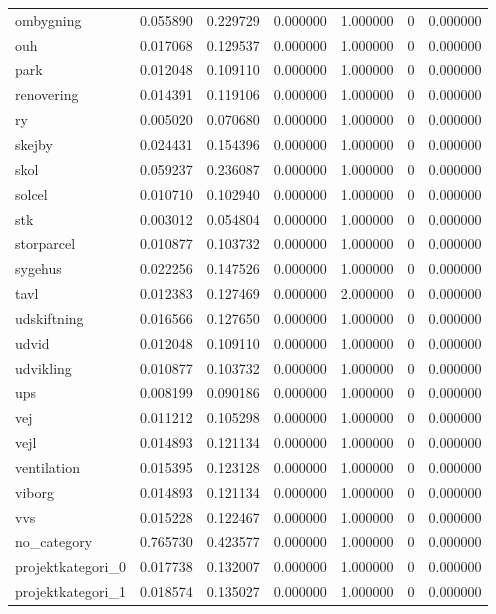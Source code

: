 \begin{landscape}
\begin{longtable}[h!]{lrrllrr}
ombygning & 0.055890 & 0.229729 & 0.000000 & 1.000000 & 0 & 0.000000 \\
ouh & 0.017068 & 0.129537 & 0.000000 & 1.000000 & 0 & 0.000000 \\
park & 0.012048 & 0.109110 & 0.000000 & 1.000000 & 0 & 0.000000 \\
renovering & 0.014391 & 0.119106 & 0.000000 & 1.000000 & 0 & 0.000000 \\
ry & 0.005020 & 0.070680 & 0.000000 & 1.000000 & 0 & 0.000000 \\
skejby & 0.024431 & 0.154396 & 0.000000 & 1.000000 & 0 & 0.000000 \\
skol & 0.059237 & 0.236087 & 0.000000 & 1.000000 & 0 & 0.000000 \\
solcel & 0.010710 & 0.102940 & 0.000000 & 1.000000 & 0 & 0.000000 \\
stk & 0.003012 & 0.054804 & 0.000000 & 1.000000 & 0 & 0.000000 \\
storparcel & 0.010877 & 0.103732 & 0.000000 & 1.000000 & 0 & 0.000000 \\
sygehus & 0.022256 & 0.147526 & 0.000000 & 1.000000 & 0 & 0.000000 \\
tavl & 0.012383 & 0.127469 & 0.000000 & 2.000000 & 0 & 0.000000 \\
udskiftning & 0.016566 & 0.127650 & 0.000000 & 1.000000 & 0 & 0.000000 \\
udvid & 0.012048 & 0.109110 & 0.000000 & 1.000000 & 0 & 0.000000 \\
udvikling & 0.010877 & 0.103732 & 0.000000 & 1.000000 & 0 & 0.000000 \\
ups & 0.008199 & 0.090186 & 0.000000 & 1.000000 & 0 & 0.000000 \\
vej & 0.011212 & 0.105298 & 0.000000 & 1.000000 & 0 & 0.000000 \\
vejl & 0.014893 & 0.121134 & 0.000000 & 1.000000 & 0 & 0.000000 \\
ventilation & 0.015395 & 0.123128 & 0.000000 & 1.000000 & 0 & 0.000000 \\
viborg & 0.014893 & 0.121134 & 0.000000 & 1.000000 & 0 & 0.000000 \\
vvs & 0.015228 & 0.122467 & 0.000000 & 1.000000 & 0 & 0.000000 \\
no_category & 0.765730 & 0.423577 & 0.000000 & 1.000000 & 0 & 0.000000 \\
projektkategori_0 & 0.017738 & 0.132007 & 0.000000 & 1.000000 & 0 & 0.000000 \\
projektkategori_1 & 0.018574 & 0.135027 & 0.000000 & 1.000000 & 0 & 0.000000 \\

\end{longtable}
\end{landscape}

